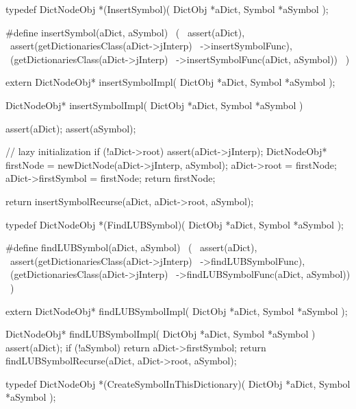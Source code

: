 \startTestSuite[insertSymbol]

\startCHeader
typedef DictNodeObj *(InsertSymbol)(
  DictObj *aDict,
  Symbol  *aSymbol
);

#define insertSymbol(aDict, aSymbol)            \
  (                                             \
    assert(aDict),                              \
    assert(getDictionariesClass(aDict->jInterp) \
      ->insertSymbolFunc),                      \
    (getDictionariesClass(aDict->jInterp)       \
      ->insertSymbolFunc(aDict, aSymbol))       \
  )
\stopCHeader

\setCHeaderStream{private}
\startCHeader
extern DictNodeObj* insertSymbolImpl(
  DictObj *aDict,
  Symbol  *aSymbol
);
\stopCHeader
\setCHeaderStream{public}

\startCCode
DictNodeObj* insertSymbolImpl(
  DictObj *aDict,
  Symbol  *aSymbol
) {
  assert(aDict);
  assert(aSymbol);

  // lazy initialization
  if (!aDict->root) {
    assert(aDict->jInterp);
    DictNodeObj* firstNode = newDictNode(aDict->jInterp, aSymbol);
    aDict->root            = firstNode;
    aDict->firstSymbol     = firstNode;
    return firstNode;
  }

  return insertSymbolRecurse(aDict, aDict->root, aSymbol);
}
\stopCCode
\stopTestSuite

\startTestSuite[findLUBSymbol]
\startCHeader
typedef DictNodeObj *(FindLUBSymbol)(
  DictObj *aDict,
  Symbol  *aSymbol
);

#define findLUBSymbol(aDict, aSymbol)           \
  (                                             \
    assert(aDict),                              \
    assert(getDictionariesClass(aDict->jInterp) \
      ->findLUBSymbolFunc),                     \
    (getDictionariesClass(aDict->jInterp)       \
      ->findLUBSymbolFunc(aDict, aSymbol))      \
  )
\stopCHeader

\startCHeader
extern DictNodeObj* findLUBSymbolImpl(
  DictObj *aDict,
  Symbol  *aSymbol
);
\stopCHeader
\setCHeaderStream{public}

\startCCode
DictNodeObj* findLUBSymbolImpl(
  DictObj *aDict,
  Symbol  *aSymbol
) {
  assert(aDict);
  if (!aSymbol) return aDict->firstSymbol;
  return findLUBSymbolRecurse(aDict, aDict->root, aSymbol);
}
\stopCCode
\stopTestSuite

\startTestSuite[createSymbol]

\startCHeader
typedef DictNodeObj *(CreateSymbolInThisDictionary)(
  DictObj *aDict,
  Symbol  *aSymbol
);

